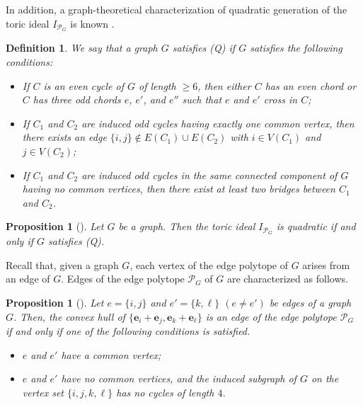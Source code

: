\documentclass[10pt,a4paper]{amsart}
\newtheorem{prop}[thm]{Proposition}
\newtheorem{definition}[thm]{Definition}
\numberwithin{thm}{section}
\numberwithin{equation}{section}
\def\epoly{{\mathcal P}_G}
\def\eb{{\mathbf e}}
\begin{document}
In addition, a graph-theoretical characterization of quadratic generation of the toric ideal $I_{\epoly}$ is known \cite{OHquad}.

\begin{definition}
We say that a graph $G$ satisfies (Q) if $G$ satisfies the following conditions:
\begin{itemize}
    \item[(i)]
    If $C$ is an even cycle of $G$ of length $\ge 6$, then either 
    $C$ has an even chord or $C$ has three odd chords $e$, $e'$, and $e''$ such that $e $ and $e'$ cross in $C$;
\item[(ii)]
If $C_1$ and $C_2$ are induced odd cycles having exactly one common
 vertex, then there exists an edge $\{i,j\} \notin  E(C_1) \cup E(C_2)$
 with $i \in V(C_1)$ and $j \in V(C_2)$;
\item[(iii)]
If $C_1$ and $C_2$ are induced odd cycles in the same connected component of $G$ having no common vertices,
then there exist at least two bridges between $C_1$ and $C_2$.
  
\end{itemize}
\end{definition}

\begin{prop}[{\cite[Theorem 1.2]{OHquad}}] \label{edgepolyquad}
Let $G$ be a graph. Then the toric ideal $I_{\epoly}$ is quadratic if and only if $G$ satisfies (Q).
\end{prop}

Recall that, given a graph $G$, each vertex of the edge polytope of $G$ arises from an edge of $G$.
Edges of the edge polytope $\epoly$ of $G$ are characterized as follows.
    
\begin{prop}[{\cite[Lemma 1.4]{OHsimple}}] \label{edge of edge}
     Let $e = \{i,j\}$ and $e'=\{k,\ell\}$ $(e \ne e')$ be edges of a graph $G$.
     Then, the convex hull of $\{\eb_i+\eb_j, \eb_k+\eb_\ell\}$ is an edge of the edge polytope $\epoly$
     if and only if one of the following
 conditions is satisfied.
 \begin{itemize}
     \item[(i)]
$e$ and $e'$ have a common vertex{\rm ;}
     \item[(ii)]
      $e$ and $e'$ have no common vertices, and the induced subgraph of $G$ on the vertex set $\{i,j,k,\ell\}$ has no cycles of length $4$.
 \end{itemize}
\end{prop}
\end{document}
